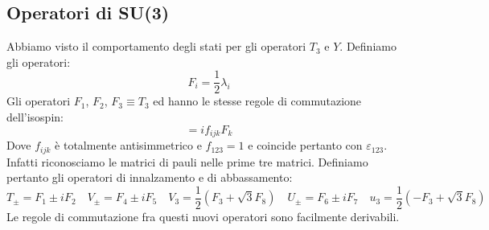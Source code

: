 \subsection{Operatori di SU(3)}
Abbiamo visto il comportamento degli stati per gli operatori $T_3$ e $Y$. Definiamo gli operatori:
\begin{equation*}
    F_i=\frac{1}{2}\lambda_i
\end{equation*}
Gli operatori $F_1$, $F_2$, $F_3$$\equiv T_3$ ed hanno le stesse regole di commutazione dell'isospin:
\begin{equation*}
    [F_i,F_j]=if_{ijk}F_k
\end{equation*}
Dove $f_{ijk}$ è totalmente antisimmetrico e $f_{123}=1$ e coincide pertanto con $\varepsilon_{123}$. Infatti riconosciamo le matrici di pauli nelle prime tre matrici. Definiamo pertanto gli operatori di innalzamento e di abbassamento:
\begin{equation*}
    T_{\pm}=F_1\pm iF_2 \quad V_{\pm}=F_4\pm iF_5 \quad V_3=\frac{1}{2}(F_3+\sqrt{3}F_8) \quad U_{\pm}=F_6\pm iF_7 \quad u_3=\frac{1}{2}(-F_3+\sqrt{3}F_8)
\end{equation*}
Le regole di commutazione fra questi nuovi operatori sono facilmente derivabili.

